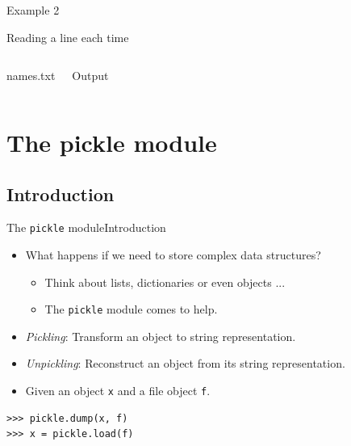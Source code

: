 \documentclass[10pt,compress]{beamer} %
\begin{document}
\begin{frame}[fragile]{Example 2}{}
	\begin{block}{Reading a line each time}
	\vspace{-0.2cm}
	
	\vspace{-0.2cm}
	\end{block}
	\begin{columns}
	\begin{block}{names.txt}
	
	\end{block}
	\begin{block}{Output}
	
	\end{block}
	\end{columns}
	
\end{frame}

\section{The pickle module}

\subsection{Introduction}
\begin{frame}[fragile]{The \texttt{pickle} module}{Introduction}
	\begin{itemize}
		\item What happens if we need to store complex data structures?
		\begin{itemize}
			\item Think about lists, dictionaries or even objects ...
			\item The \texttt{pickle} module comes to help.
		\end{itemize}
		\item \textit{Pickling}: Transform an object to string representation.
		\item \textit{Unpickling}: Reconstruct an object from its string representation.
		\item Given an object \texttt{x} and a file object \texttt{f}.
	\end{itemize}
\begin{verbatim}
>>> pickle.dump(x, f)
>>> x = pickle.load(f)
\end{verbatim}
\end{frame}
\end{document}

